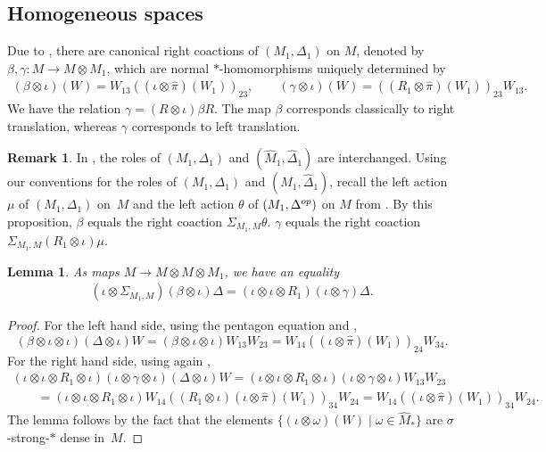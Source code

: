 \documentclass[11pt]{article}
\numberwithin{equation}{section}
\newtheorem{lem}[thm]{Lemma}
\theoremstyle{definition}
\newtheorem{rmk}[thm]{Remark}
\begin{document}
\subsection*{Homogeneous spaces}
Due to \cite[Proposition 3.1]{VaeVaiExt}, there are canonical right coactions of $(M_1, \Delta_1)$ on $M$, denoted by $\beta, \gamma: M \rightarrow M \otimes M_1$, which are normal $\ast$-homomorphisms uniquely determined by
\begin{gather}\label{EqnBeta}
 (\beta \otimes \iota)(W)  = W_{13} \left((\iota \otimes \hat{\pi})(W_1)\right)_{23}, \qquad
 (\gamma \otimes \iota)(W) =  \left((R_1 \otimes \hat{\pi})(W_1)\right)_{23} W_{13}.
\end{gather}
We have the relation $\gamma = (R \otimes \iota)  \beta  R$. The map $\beta$ corresponds classically to right translation, whereas $\gamma$ corresponds to left translation.

\begin{rmk}
 In \cite[Section 3]{VaeVaiExt}, the roles of $(M_1, \Delta_1)$ and $(\hat{M}_1, \hat{\Delta}_1)$ are interchanged. Using our conventions for the roles of $(M_1, \Delta_1)$ and $(\hat{M}_1, \hat{\Delta}_1)$, recall the left action $\mu$ of $(M_1, \Delta_1)$ on~$M$ and the left action $\theta$ of $(M_1, \Delta^{\rm op})$ on $M$ from \cite[Proposition~3.1]{VaeVaiExt}. By this proposition, $\beta$ equals the right coaction $\Sigma_{M_1, M}   \theta$. $\gamma$ equals the right coaction $\Sigma_{M_1, M} (R_1 \otimes \iota) \mu$.
\end{rmk}


\begin{lem}\label{LemInterchangeLR}
As maps $M \rightarrow M \otimes M \otimes M_1$, we have an equality
\begin{gather}
 (\iota \otimes \Sigma_{M_1, M}) (\beta \otimes \iota)  \Delta  = (\iota \otimes \iota \otimes R_1)(\iota \otimes \gamma) \Delta.\label{EqnGammaBetaRelI}
\end{gather}
\end{lem}
\begin{proof}
For the left hand side, using the pentagon equation and \cite[Proposition 3.1]{VaeVaiExt},
 \[
  (\beta \otimes \iota \otimes \iota)  (\Delta\otimes \iota) W = (\beta \otimes \iota \otimes \iota)  W_{13} W_{23} =
W_{14} ((\iota \otimes \hat{\pi})(W_1))_{24} W_{34}.
 \]
For the right hand side, using again \cite[Proposition 3.1]{VaeVaiExt},
\begin{gather*}
 (\iota \otimes \iota \otimes R_1 \otimes \iota)(\iota \otimes \gamma \otimes \iota) (\Delta \otimes \iota) W =
 (\iota \otimes \iota \otimes R_1 \otimes \iota)(\iota \otimes \gamma \otimes \iota) W_{13} W_{23} \\
\qquad {}=   (\iota \otimes \iota \otimes R_1 \otimes \iota) W_{14} ((R_1 \otimes \iota)(\iota \otimes \hat{\pi})(W_1))_{34} W_{24} =
W_{14} ((\iota \otimes \hat{\pi})(W_1))_{34} W_{24}.
\end{gather*}
The lemma follows by the fact that the elements $\{ (\iota \otimes \omega)(W) \mid \omega \in \hat{M}_\ast\}$ are $\sigma$-strong-$\ast$ dense in~$M$.
\end{proof}
\end{document}
